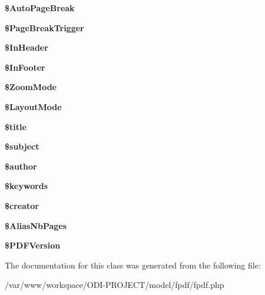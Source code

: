 \begin{DoxyCompactItemize}
\item 
{\bfseries \$\+Auto\+Page\+Break}\label{class_f_p_d_f_a9f98b5479c6c4bb56c7bb4af7c076f06}

\item 
{\bfseries \$\+Page\+Break\+Trigger}\label{class_f_p_d_f_a7919854eaa8b62fe655376100b5191fc}

\item 
{\bfseries \$\+In\+Header}\label{class_f_p_d_f_afda3d073df555e6a00426bebd37050fe}

\item 
{\bfseries \$\+In\+Footer}\label{class_f_p_d_f_a3bba0649f5b1a6a820bcb7242957611c}

\item 
{\bfseries \$\+Zoom\+Mode}\label{class_f_p_d_f_aef0c9d2afc8e2f1a4788c1575b304334}

\item 
{\bfseries \$\+Layout\+Mode}\label{class_f_p_d_f_a1d36cfb560ff9d51bff555f511461e38}

\item 
{\bfseries \$title}\label{class_f_p_d_f_ada57e7bb7c152edad18fe2f166188691}

\item 
{\bfseries \$subject}\label{class_f_p_d_f_afea90503726cd5ad2eb80baf0b6d217d}

\item 
{\bfseries \$author}\label{class_f_p_d_f_ac35b828f7d4064a7c9f849c255468ee3}

\item 
{\bfseries \$keywords}\label{class_f_p_d_f_a9fbd95bfcdf27d802a8c7938529a61ba}

\item 
{\bfseries \$creator}\label{class_f_p_d_f_a3ebaa535f689506e9f6766abf8386086}

\item 
{\bfseries \$\+Alias\+Nb\+Pages}\label{class_f_p_d_f_a112f2880e6aeae3af619c43d40ecff9e}

\item 
{\bfseries \$\+P\+D\+F\+Version}\label{class_f_p_d_f_a1a5013add4436f89823ec3d72d53700d}

\end{DoxyCompactItemize}


The documentation for this class was generated from the following file\+:\begin{DoxyCompactItemize}
\item 
/var/www/workspace/\+O\+D\+I-\/\+P\+R\+O\+J\+E\+C\+T/model/fpdf/fpdf.\+php\end{DoxyCompactItemize}
